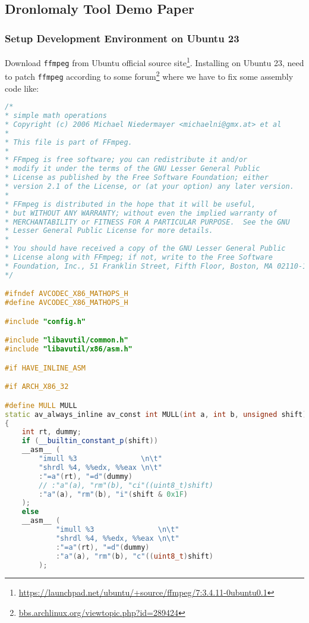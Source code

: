 \subsection{Dronlomaly Tool Demo Paper}
\label{task:20240111_androidtesting}

\subsubsection{Setup Development Environment on Ubuntu 23}

Download \texttt{ffmpeg} from Ubuntu official source site\footnote{\url{https://launchpad.net/ubuntu/+source/ffmpeg/7:3.4.11-0ubuntu0.1}}. Installing on Ubuntu 23, need to patch \texttt{ffmpeg} according to some forum\footnote{\url{bbs.archlinux.org/viewtopic.php?id=289424}} where we have to fix some assembly code like:
\begin{lstlisting}[language=C++]
/*
* simple math operations
* Copyright (c) 2006 Michael Niedermayer <michaelni@gmx.at> et al
*
* This file is part of FFmpeg.
*
* FFmpeg is free software; you can redistribute it and/or
* modify it under the terms of the GNU Lesser General Public
* License as published by the Free Software Foundation; either
* version 2.1 of the License, or (at your option) any later version.
*
* FFmpeg is distributed in the hope that it will be useful,
* but WITHOUT ANY WARRANTY; without even the implied warranty of
* MERCHANTABILITY or FITNESS FOR A PARTICULAR PURPOSE.  See the GNU
* Lesser General Public License for more details.
*
* You should have received a copy of the GNU Lesser General Public
* License along with FFmpeg; if not, write to the Free Software
* Foundation, Inc., 51 Franklin Street, Fifth Floor, Boston, MA 02110-1301 USA
*/

#ifndef AVCODEC_X86_MATHOPS_H
#define AVCODEC_X86_MATHOPS_H

#include "config.h"

#include "libavutil/common.h"
#include "libavutil/x86/asm.h"

#if HAVE_INLINE_ASM

#if ARCH_X86_32

#define MULL MULL
static av_always_inline av_const int MULL(int a, int b, unsigned shift)
{
    int rt, dummy;
    if (__builtin_constant_p(shift))
    __asm__ (
        "imull %3               \n\t"
        "shrdl %4, %%edx, %%eax \n\t"
        :"=a"(rt), "=d"(dummy)
        // :"a"(a), "rm"(b), "ci"((uint8_t)shift)
        :"a"(a), "rm"(b), "i"(shift & 0x1F)
    );
    else 
    __asm__ (
            "imull %3               \n\t"
            "shrdl %4, %%edx, %%eax \n\t"
            :"=a"(rt), "=d"(dummy)
            :"a"(a), "rm"(b), "c"((uint8_t)shift)
        );


\end{lstlisting}
